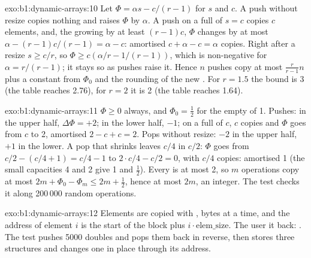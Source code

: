 \begin{solution}{exo:b1:dynamic-arrays:10}
Let $\Phi = \alpha s - c/(r - 1)$ for  $s$ and  $c$. A push without resize copies nothing and raises $\Phi$ by
$\alpha$. A push on a full  of  $s = c$ copies $c$ elements, and, the  growing by at least $(r - 1)c$,
$\Phi$ changes by at most $\alpha - (r - 1)c/(r - 1) = \alpha - c$: amortised $c + \alpha - c = \alpha$ copies. Right after a resize $s \geq c/r$, so $\Phi \geq c(\alpha/r -
1/(r - 1))$, which is non-negative for $\alpha = r/(r - 1)$; it stays so as pushes raise it. Hence $n$ pushes copy at most
$\frac{r}{r - 1} n$ plus a constant from $\Phi_0$ and the rounding of the new . For $r = 1.5$ the bound is 3
(the table reaches 2.76), for $r = 2$ it is 2 (the table reaches 1.64).
\end{solution}

\begin{solution}{exo:b1:dynamic-arrays:11}
$\Phi \geq 0$ always, and $\Phi_0 = \frac12$ for the empty  of  1. Pushes: in the upper half, $\Delta\Phi =
+2$; in the lower half, $-1$; on a full  of  $c$, $c$ copies and $\Phi$ goes from $c$ to 2, amortised $2 - c + c =
2$. Pops without resize: $-2$ in the upper half, $+1$ in the lower. A pop that shrinks leaves  $c/4$ in 
$c/2$: $\Phi$ goes from $c/2 - (c/4 + 1) = c/4 - 1$ to $2 \cdot c/4 - c/2 = 0$, with $c/4$ copies: amortised 1 (the
small capacities 4 and 2 give 1 and $\frac12$). Every  is at most 2, so $m$ operations copy at most $2m +
\Phi_0 - \Phi_m \leq 2m + \frac12$, hence at most $2m$, an integer. The test checks it along 200\,000 random operations.
\end{solution}

\begin{solution}{exo:b1:dynamic-arrays:12}
Elements are copied with ,  bytes at a time, and the address of element $i$ is the start of
the block plus $i \cdot \text{elem\_size}$. The user  it back: . The test pushes
5000 doubles and pops them back in reverse, then stores three  structures and changes one in place through
its address.
\end{solution}

